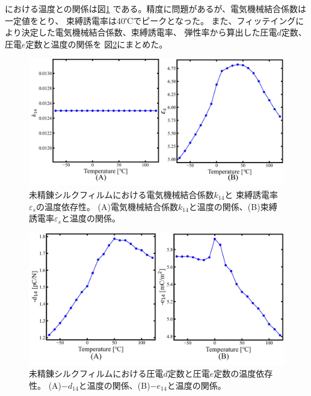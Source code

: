 \documentclass[dvipdfmx,12pt,a4paper]{jreport}
\begin{document}
			における温度との関係は図\ref{0回_電気機械結合係数_束縛誘電率_温度依存性}
			である。精度に問題があるが、電気機械結合係数は一定値をとり、
			束縛誘電率は40℃でピークとなった。
			また、フィッテイングにより決定した電気機械結合係数、束縛誘電率、
			弾性率から算出した圧電$d$定数、圧電$e$定数と温度の関係を
			図\ref{0回_d定数_e定数_温度依存性}にまとめた。
			\begin{figure}[h]
				\centering
				\includegraphics[width=\linewidth]{0回_電気機械結合係数_誘電率.jpg}
				\caption{未精錬シルクフィルムにおける電気機械結合係数$k_{14}$と
				束縛誘電率$\varepsilon_s$の温度依存性。
				(A)電気機械結合係数$k_{14}$と温度の関係、(B)束縛誘電率$\varepsilon_s$と温度の関係。}
				\label{0回_電気機械結合係数_束縛誘電率_温度依存性}
			\end{figure}
			\begin{figure}[H]
				\centering
				\includegraphics[width=\linewidth]{0回_d定数_e定数_温度依存性.jpg}
				\caption{未精錬シルクフィルムにおける圧電$d$定数と圧電$e$定数の温度依存性。
				(A)$-d_{14}$と温度の関係、(B)$-e_{14}$と温度の関係。}
				\label{0回_d定数_e定数_温度依存性}
			\end{figure}
			\newpage
			
\end{document}
